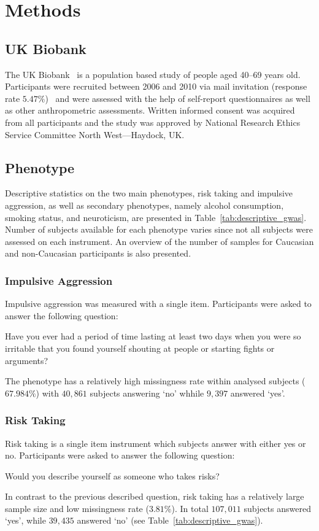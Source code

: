 \section{Methods}
\label{sec:methods_assoc}

\subsection{UK Biobank}
\label{sub:uk_biobank}
The UK Biobank~\cite{Allen2014} is a population based study of people aged 40--69 years old. 
Participants were recruited between 2006 and 2010 via mail invitation (response rate $5.47\%$)~\cite{Sudlow2015} and were assessed with the help of self-report questionnaires as well as other anthropometric assessments.
Written informed consent was acquired from all participants and the study was approved by National Research Ethics Service Committee North West---Haydock, UK\@.

\subsection{Phenotype}
\label{sub:phenotype}

Descriptive statistics on the two main phenotypes, risk taking and impulsive aggression,
as well as secondary phenotypes, namely alcohol consumption, smoking status, and neuroticism, are presented in Table~\ref{tab:descriptive_gwas}.  
Number of subjects available for each phenotype varies since not all subjects were assessed on each instrument.
An overview of the number of samples for Caucasian and non-Caucasian participants is also presented.

\subsubsection{Impulsive Aggression}
\label{ssub:impulsive_aggression}
Impulsive aggression was measured with a single item.
Participants were asked to answer the following question:
\begin{displayquote}
  Have you ever had a period of time lasting at least two days when you were so irritable that you found yourself shouting at people or starting fights or arguments?
\end{displayquote}
The phenotype has a relatively high missingness rate within analysed subjects ($67.984\%$) with $40,861$ subjects answering `no' whhile $9,397$ answered `yes'.

\subsubsection{Risk Taking}
\label{ssub:risk_taking}
Risk taking is a single item instrument which subjects answer with either yes or no.
Participants were asked to answer the following question:
\begin{displayquote}
  Would you describe yourself as someone who takes risks?
\end{displayquote}
In contrast to the previous described question, risk taking has a relatively large sample size and low missingness rate ($3.81\%$).
In total $107,011$ subjects answered `yes', while $39,435$ answered `no' (see Table~\ref{tab:descriptive_gwas}).


